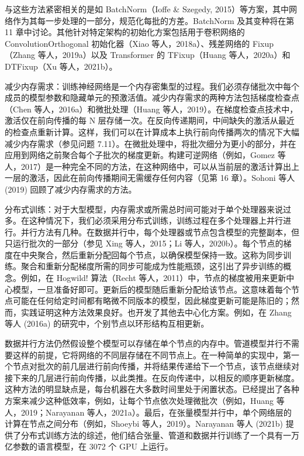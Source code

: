 与这些方法紧密相关的是如 BatchNorm（Ioffe \& Szegedy, 2015）等方案，其中网络作为其每一步处理的一部分，规范化每批的方差。BatchNorm 及其变种将在第 11 章中讨论。其他针对特定架构的初始化方案包括用于卷积网络的 ConvolutionOrthogonal 初始化器（Xiao 等人，2018a）、残差网络的 Fixup（Zhang 等人，2019a）以及 Transformer 的 TFixup（Huang 等人，2020a）和 DTFixup（Xu 等人，2021b）。

减少内存需求：训练神经网络是一个内存密集型的过程。我们必须存储批次中每个成员的模型参数和隐藏单元的预激活值。减少内存需求的两种方法包括梯度检查点（Chen 等人，2016a）和微批处理（Huang 等人，2019）。在梯度检查点技术中，激活仅在前向传播的每 N 层存储一次。在反向传递期间，中间缺失的激活从最近的检查点重新计算。这样，我们可以在计算成本上执行前向传播两次的情况下大幅减少内存需求（参见问题 7.11）。在微批处理中，将批次细分为更小的部分，并在应用到网络之前聚合每个子批次的梯度更新。构建可逆网络（例如，Gomez 等人，2017）是一种完全不同的方法，在这种网络中，可以从当前层的激活计算出上一层的激活，因此在前向传播期间无需缓存任何内容（见第 16 章）。Sohoni 等人 (2019) 回顾了减少内存需求的方法。

分布式训练：对于大型模型，内存需求或所需总时间可能对于单个处理器来说过多。在这种情况下，我们必须采用分布式训练，训练过程在多个处理器上并行进行。并行方法有几种。在数据并行中，每个处理器或节点包含模型的完整副本，但只运行批次的一部分（参见 Xing 等人，2015；Li 等人，2020b）。每个节点的梯度在中央聚合，然后重新分配回每个节点，以确保模型保持一致。这称为同步训练。聚合和重新分配梯度所需的同步可能成为性能瓶颈，这引出了异步训练的概念。例如，在 Hogwild! 算法（Recht 等人，2011）中，节点的梯度被用来更新中心模型，一旦准备好即可。更新后的模型随后重新分配给该节点。这意味着每个节点可能在任何给定时间都有略微不同版本的模型，因此梯度更新可能是陈旧的；然而，实践证明这种方法效果良好。也开发了其他去中心化方案。例如，在 Zhang 等人 (2016a) 的研究中，个别节点以环形结构互相更新。

数据并行方法仍然假设整个模型可以存储在单个节点的内存中。管道模型并行不需要这样的前提，它将网络的不同层存储在不同节点上。在一种简单的实现中，第一个节点对批次的前几层进行前向传播，并将结果传递给下一个节点，该节点继续对接下来的几层进行前向传播，以此类推。在反向传递中，以相反的顺序更新梯度。这种方法的明显缺点是，每台机器在大多数时间里处于闲置状态。已经提出了各种方案来减少这种低效率，例如，让每个节点依次处理微批次（例如，Huang 等人，2019；Narayanan 等人，2021a）。最后，在张量模型并行中，单个网络层的计算在节点之间分布（例如，Shoeybi 等人，2019）。Narayanan 等人 (2021b) 提供了分布式训练方法的综述，他们结合张量、管道和数据并行训练了一个具有一万亿参数的语言模型，在 3072 个 GPU 上运行。

